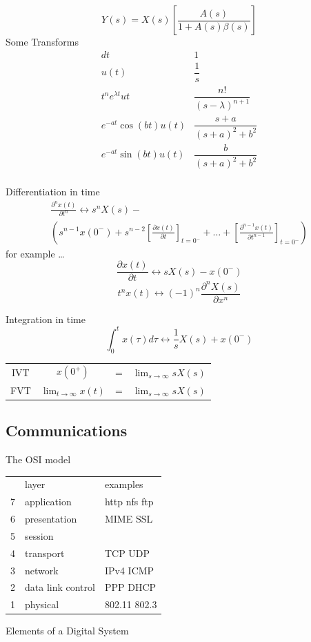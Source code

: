 \[Y(s) = X(s)\left[ \frac{A(s)}{1+A(s) \beta (s)}\right] \]
Some Transforms
\[
\begin{array}{cc}
d{t}&1\\
u(t)&\dfrac{1}{s}\\
t^n e^{\lambda t} u{t}& \dfrac{n!}{(s - \lambda)^{n+1}}\\
e^{-at}\cos{(bt)}u(t)& \dfrac{s+a}{(s+a)^2 + b^2}\\
e^{-at}\sin{(bt)}u(t)& \dfrac{b}{(s+a)^2 + b^2}\\
\end{array}
\]

Differentiation in time
\[
\begin{array}{l}
\frac{\partial^n x(t)}{\partial t^n} \leftrightarrow s^nX(s) - \\
\left(s^{n-1} x(0^-) + s^{n-2}\left[\frac{\partial x(t)}{\partial
t}\right]_{t=0^-}+ \ldots + \left[\frac{\partial^{n-1}x(t)}{\partial t^{n-1}}
\right]_{t=0^-}\right) \end{array}
\]
for example \ldots 
\[\frac{\partial x(t)}{\partial t} \leftrightarrow sX(s) - x(0^-)\]
\[t^nx(t) \leftrightarrow (-1)^n \frac{\partial^nX(s)}{\partial x^n}\]

Integration in time
\[
\int^t_{0} x(\tau) d\tau \leftrightarrow \frac{1}{s}X(s) +  x(0^-)
\]
\begin{tabular}{cccc}
IVT&$x(0^+)$&=&$\lim_{s \to \infty} sX(s)$\\
FVT&$\lim_{t\to \infty} x(t)$&=&$\lim_{s\to \infty} sX(s)$
\end{tabular}

\clearpage
\subsection*{Communications}
The OSI model

\begin{tabular}{cll}
&layer&examples\\
7&application&http nfs ftp\\
6&presentation&MIME SSL\\
5&session&\\
4&transport&TCP UDP\\
3&network&IPv4 ICMP\\
2&data link control&PPP DHCP\\
1&physical&802.11 802.3\\
\end{tabular}

Elements of a Digital System

